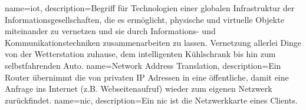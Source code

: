 


{
  name={\acrlong{iot}},
  description={Begriff für Technologien einer globalen Infrastruktur der Informationsgesellschaften, die es ermöglicht, physische und virtuelle Objekte miteinander zu vernetzen und sie durch Informations- und Kommunikationstechniken zusammenarbeiten zu lassen. Vernetzung allerlei Dinge von der Wetterstation zuhause, dem intelligenten Kühlschrank bis hin zum selbstfahrenden Auto.}
}
{
  name={Network Address Translation},
  description={Ein Router übernimmt die \grqq{} von privaten IP Adressen in eine öffentliche, damit eine Anfrage ins Internet (z.B. Webseitenaufruf) wieder zum eigenen Netzwerk zurückfindet.}
}
{
  name={\acrlong{nic}},
  description={Ein \acrshort{nic} ist die Netzwerkkarte eines Clients.}
}
